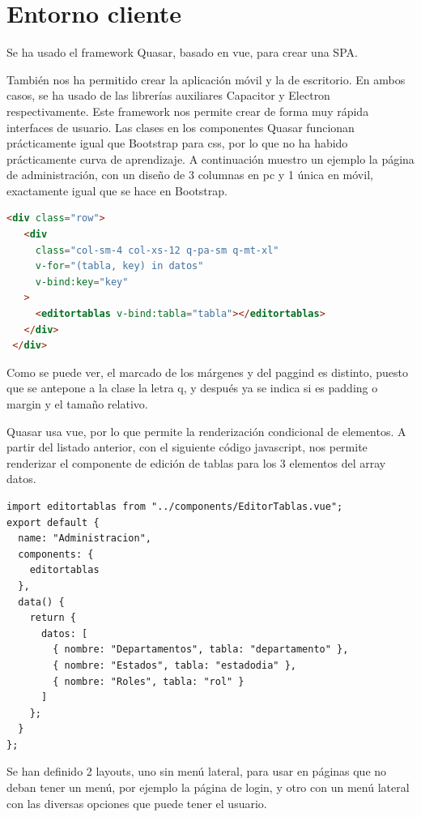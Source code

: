 \documentclass[11pt,spanish,listoffigures,listoftables]{tfgetsinf}
\begin{document}
\section{Entorno cliente}

Se ha usado el framework Quasar, basado en vue, para crear una SPA. 

También nos ha permitido crear la aplicación móvil y la de escritorio. En ambos casos, se ha usado de las librerías auxiliares Capacitor y Electron respectivamente.
Este framework nos permite crear de forma muy rápida interfaces de usuario. 
Las clases en los componentes Quasar funcionan prácticamente igual que Bootstrap para css, por lo que no ha habido prácticamente curva de aprendizaje.
A continuación muestro un ejemplo la página de administración, con un diseño de 3 columnas en pc y 1 única en móvil, exactamente igual que se hace en Bootstrap.

\begin{lstlisting}[language=HTML]
   <div class="row">
   <div
     class="col-sm-4 col-xs-12 q-pa-sm q-mt-xl"
     v-for="(tabla, key) in datos"
     v-bind:key="key"
   >
     <editortablas v-bind:tabla="tabla"></editortablas>
   </div>
 </div>
\end{lstlisting}
Como se puede ver, el marcado de los márgenes y del paggind es distinto, puesto que se antepone a la clase la letra q, y después ya se indica si es padding o margin y el tamaño relativo.

Quasar usa vue, por lo que permite la renderización condicional de elementos. A partir del listado anterior, con el siguiente código javascript, nos permite renderizar el componente de edición de tablas para los 3 elementos del array datos.

\begin{lstlisting}[style=ES6, caption={ES6 (ECMAScript-2015) Listing}]
import editortablas from "../components/EditorTablas.vue";
export default {
  name: "Administracion",
  components: {
    editortablas
  },
  data() {
    return {
      datos: [
        { nombre: "Departamentos", tabla: "departamento" },
        { nombre: "Estados", tabla: "estadodia" },
        { nombre: "Roles", tabla: "rol" }
      ]
    };
  }
};
\end{lstlisting}

Se han definido 2 layouts, uno sin menú lateral, para usar en páginas que no deban tener un menú, por ejemplo la página de login, y otro con un menú lateral con las diversas opciones que puede tener el usuario.
\end{document}
